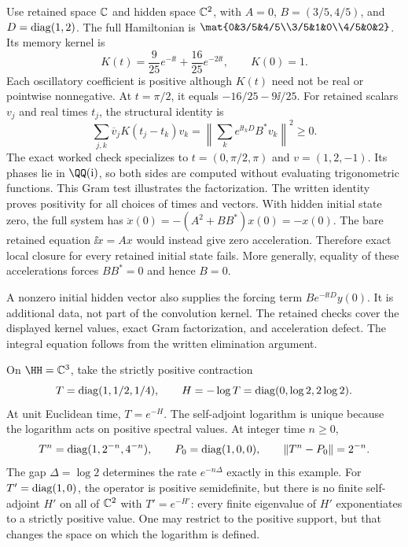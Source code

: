 Use retained space $\CC$ and hidden space $\CC^2$, with $A=0$, $B=(3/5,4/5)$, and $D=\operatorname{diag}(1,2)$. The full Hamiltonian is $\mat{0&3/5&4/5\\3/5&1&0\\4/5&0&2}$. Its memory kernel is
\[
K(t)=\frac9{25}e^{-\ii t}+\frac{16}{25}e^{-2\ii t},
\qquad K(0)=1.
\]
Each oscillatory coefficient is positive although $K(t)$ need not be real or pointwise nonnegative. At $t=\pi/2$, it equals $-16/25-9\ii/25$.
For retained scalars $v_j$ and real times $t_j$, the structural identity is
\[
\sum_{j,k}\overline v_jK(t_j-t_k)v_k
=\left\|\sum_k e^{\ii t_kD}B^*v_k\right\|^2\geq0.
\]
The exact worked check specializes to $t=(0,\pi/2,\pi)$ and $v=(1,2,-1)$. Its phases lie in $\QQ(\ii)$, so both sides are computed without evaluating trigonometric functions. This Gram test illustrates the factorization. The written identity proves positivity for all choices of times and vectors.
With hidden initial state zero, the full system has $\ddot x(0)=-(A^2+BB^*)x(0)=-x(0)$. The bare retained equation $\ii\dot x=Ax$ would instead give zero acceleration. Therefore exact local closure for every retained initial state fails. More generally, equality of these accelerations forces $BB^*=0$ and hence $B=0$.

A nonzero initial hidden vector also supplies the forcing term $Be^{-\ii tD}y(0)$. It is additional data, not part of the convolution kernel. The retained checks cover the displayed kernel values, exact Gram factorization, and acceleration defect. The integral equation follows from the written elimination argument.

On $\HH=\CC^3$, take the strictly positive contraction
\[
T=\operatorname{diag}(1,1/2,1/4),\qquad H=-\log T=\operatorname{diag}(0,\log2,2\log2).
\]
At unit Euclidean time, $T=e^{-H}$. The self-adjoint logarithm is unique because the logarithm acts on positive spectral values. At integer time $n\geq0$,
\[
T^n=\operatorname{diag}(1,2^{-n},4^{-n}),\qquad
P_0=\operatorname{diag}(1,0,0),\qquad\left\lVert T^n-P_0\right\rVert=2^{-n}.
\]
The gap $\Delta=\log2$ determines the rate $e^{-n\Delta}$ exactly in this example.
For $T'=\operatorname{diag}(1,0)$, the operator is positive semidefinite, but there is no finite self-adjoint $H'$ on all of $\CC^2$ with $T'=e^{-H'}$: every finite eigenvalue of $H'$ exponentiates to a strictly positive value. One may restrict to the positive support, but that changes the space on which the logarithm is defined.

